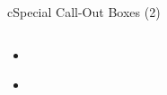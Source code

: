 \begin{myslide}{c}{Special Call-Out Boxes (2)}

\begin{columns}

\begin{column}{1\textwidth}

\begin{itemize}[<+->]

\itembox
\begin{myremark}
\lipsum[1][1]
\end{myremark}

\item \lipsum[1][6]%

\itembox
\begin{myquestion}
\lipsum[1][1]
\end{myquestion}

\itembox
\begin{myremark}
\lipsum[1][1]
\end{myremark}

\item \lipsum[1][6]

\end{itemize}

\end{column}

\end{columns}

\end{myslide}
